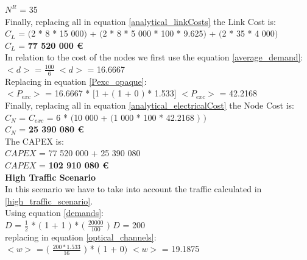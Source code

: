 $N^R$ = 35\\

Finally, replacing all in equation \ref{analytical_linkCosts} the Link Cost is:\\

$C_L$ = $($2 * 8 * 15 000$)$ + $($2 * 8 * 5 000 * 100 * 9.625$)$ + $($2 * 35 * 4 000$)$\\

$C_L$ = \textbf{77 520 000 \euro}\\

In relation to the cost of the nodes we first use the equation \ref{average_demand}:\\

$<d>$ = $\frac{100}{6}$ \qquad \qquad $<d>$ = 16.6667\\

Replacing in equation \ref{Pexc_opaque}:\\

$<P_{exc}>$ = 16.6667 * $[$1 + $($ 1 + 0 $)$ * 1.533$]$ \qquad \qquad $<P_{exc}>$ = 42.2168 \\

Finally, replacing all in equation \ref{analytical_electricalCost} the Node Cost is:\\

$C_N$ = $C_{exc}$ = 6 * $($10 000 + $($1 000 * 100 * 42.2168 $)$ $)$\\

$C_N$ = \textbf{25 390 080 \euro}\\

The CAPEX is:\\
$CAPEX$ = 77 520 000 + 25 390 080\\

$CAPEX$ = \textbf{102 910 080 \euro}\\

\textbf{High Traffic Scenario}\\
In this scenario we have to take into account the traffic calculated in \ref{high_traffic_scenario}.\\

Using equation \ref{demands}:\\

$D$ = $\frac{1}{2}$ * $($ 1 + 1 $)$ * $($ $\frac{20 000}{100}$ $)$ \qquad \qquad $D$ = 200\\

replacing in equation \ref{optical_channels}:\\

$<w>$ = $($ $\frac{200 * 1.533}{16}$ $)$ * $($ 1 + 0$)$ \qquad \quad $<w>$ = 19.1875\\

